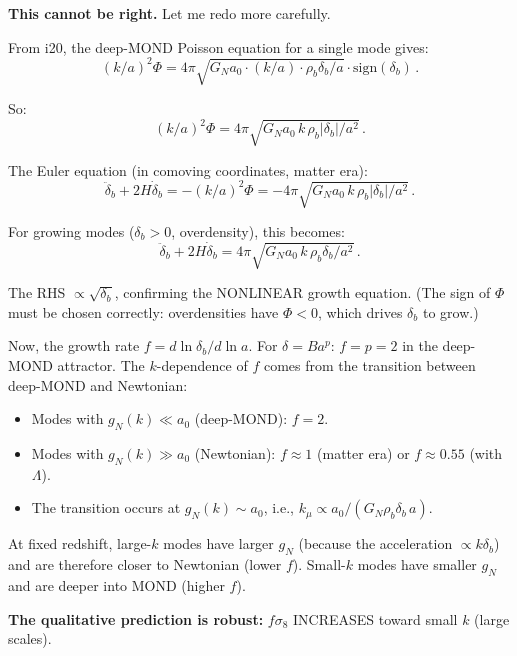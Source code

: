 \documentclass[11pt]{article}
\newcommand{\aM}{a_0}
\begin{document}
\textbf{This cannot be right.}  Let me redo more carefully.

From i20, the deep-MOND Poisson equation for a single mode gives:
\begin{equation}
(k/a)^2\Phi = 4\pi\sqrt{G_N\aM\cdot(k/a)\cdot\rho_b\delta_b/a}\cdot
\text{sign}(\delta_b)\,.
\end{equation}

So:
\begin{equation}
(k/a)^2\Phi = 4\pi\sqrt{G_N\aM\,k\,\rho_b|\delta_b|/a^2}\,.
\end{equation}

The Euler equation (in comoving coordinates, matter era):
\begin{equation}
\ddot\delta_b + 2H\dot\delta_b = -(k/a)^2\Phi
= -4\pi\sqrt{G_N\aM\,k\,\rho_b|\delta_b|/a^2}\,.
\end{equation}

For growing modes ($\delta_b > 0$, overdensity), this becomes:
\begin{equation}
\ddot\delta_b + 2H\dot\delta_b = 4\pi\sqrt{G_N\aM\,k\,\rho_b\delta_b/a^2}\,.
\end{equation}

The RHS $\propto \sqrt{\delta_b}$, confirming the NONLINEAR growth equation.
(The sign of $\Phi$ must be chosen correctly: overdensities have $\Phi < 0$,
which drives $\delta_b$ to grow.)

Now, the growth rate $f = d\ln\delta_b/d\ln a$.  For $\delta = Ba^p$:
$f = p = 2$ in the deep-MOND attractor.  The $k$-dependence of $f$ comes
from the transition between deep-MOND and Newtonian:

\begin{itemize}
\item Modes with $g_N(k) \ll \aM$ (deep-MOND): $f = 2$.
\item Modes with $g_N(k) \gg \aM$ (Newtonian): $f \approx 1$ (matter era)
  or $f \approx 0.55$ (with $\Lambda$).
\item The transition occurs at $g_N(k) \sim \aM$, i.e.,
  $k_\mu \propto \aM/(G_N\rho_b\delta_b\,a)$.
\end{itemize}

At fixed redshift, large-$k$ modes have larger $g_N$ (because the
acceleration $\propto k\delta_b$) and are therefore closer to Newtonian
(lower $f$).  Small-$k$ modes have smaller $g_N$ and are deeper into
MOND (higher $f$).

\textbf{The qualitative prediction is robust:}
$f\sigma_8$ INCREASES toward small $k$ (large scales).
\end{document}
